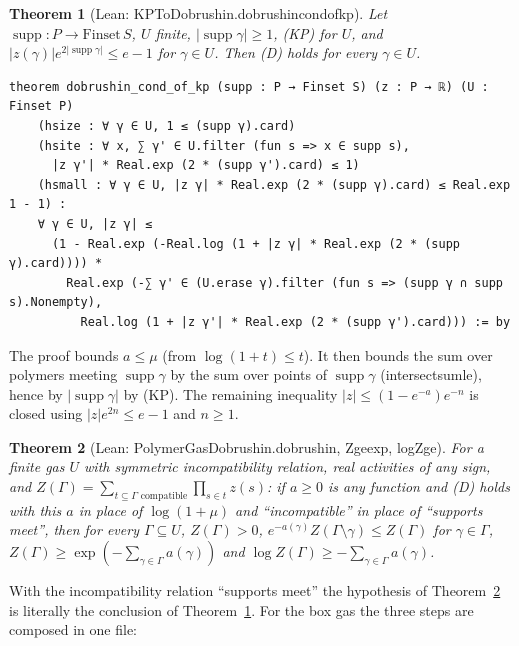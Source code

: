 \documentclass[11pt,a4paper]{article}
\newtheorem{theorem}{Theorem}[section]
\theoremstyle{definition}
\theoremstyle{remark}
\DeclareRobustCommand{\lean}[1]{{\ttfamily\renewcommand{\_}{\textunderscore\allowbreak}#1}}
\newenvironment{leanquote}{\par\smallskip\footnotesize}{\par\smallskip}
\newcommand{\supp}{\operatorname{supp}}
\begin{document}
\begin{theorem}[Lean: \lean{KPToDobrushin.dobrushin\_cond\_of\_kp}]\label{thm:kpd}
Let $\supp:P\to\mathrm{Finset}\,S$, $U$ finite, $|\supp\gamma|\ge1$, (KP) for $U$, and $|z(\gamma)|e^{2|\supp\gamma|}\le e-1$ for $\gamma\in U$. Then (D) holds for every $\gamma\in U$.
\end{theorem}
\begin{leanquote}
\begin{verbatim}
theorem dobrushin_cond_of_kp (supp : P → Finset S) (z : P → ℝ) (U : Finset P)
    (hsize : ∀ γ ∈ U, 1 ≤ (supp γ).card)
    (hsite : ∀ x, ∑ γ' ∈ U.filter (fun s => x ∈ supp s),
      |z γ'| * Real.exp (2 * (supp γ').card) ≤ 1)
    (hsmall : ∀ γ ∈ U, |z γ| * Real.exp (2 * (supp γ).card) ≤ Real.exp 1 - 1) :
    ∀ γ ∈ U, |z γ| ≤
      (1 - Real.exp (-Real.log (1 + |z γ| * Real.exp (2 * (supp γ).card)))) *
        Real.exp (-∑ γ' ∈ (U.erase γ).filter (fun s => (supp γ ∩ supp s).Nonempty),
          Real.log (1 + |z γ'| * Real.exp (2 * (supp γ').card))) := by
\end{verbatim}
\end{leanquote}
The proof bounds $a\le\mu$ (from $\log(1+t)\le t$). It then bounds the sum over polymers meeting $\supp\gamma$ by the sum over points of $\supp\gamma$ (\lean{intersect\_sum\_le}), hence by $|\supp\gamma|$ by (KP). The remaining inequality $|z|\le(1-e^{-a})e^{-n}$ is closed using $|z|e^{2n}\le e-1$ and $n\ge1$.

\begin{theorem}[Lean: \lean{PolymerGasDobrushin.dobrushin}, \lean{Z\_ge\_exp}, \lean{log\_Z\_ge}]\label{thm:Z}
For a finite gas $U$ with symmetric incompatibility relation, real activities of any sign, and $Z(\Gamma)=\sum_{t\subseteq\Gamma\text{ compatible}}\prod_{s\in t}z(s)$: if $a\ge0$ is any function and (D) holds with this $a$ in place of $\log(1+\mu)$ and ``incompatible'' in place of ``supports meet'', then for every $\Gamma\subseteq U$, $Z(\Gamma)>0$, $e^{-a(\gamma)}Z(\Gamma\setminus\gamma)\le Z(\Gamma)$ for $\gamma\in\Gamma$, $Z(\Gamma)\ge\exp(-\sum_{\gamma\in\Gamma}a(\gamma))$ and $\log Z(\Gamma)\ge-\sum_{\gamma\in\Gamma}a(\gamma)$.
\end{theorem}
With the incompatibility relation ``supports meet'' the hypothesis of Theorem~\ref{thm:Z} is literally the conclusion of Theorem~\ref{thm:kpd}. For the box gas the three steps are composed in one file:
\end{document}
